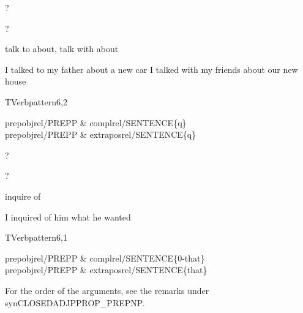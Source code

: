
\begin{thetadescr}
\evitem ?
\esitem
     \begin{examples}
        \example  ?
     \end{examples}
\end{thetadescr}



\begin{thetadescr}
\evitem talk to about, talk with about
\esitem
     \begin{examples}
        \example I talked to my father about a new car
        \example I talked with my friends about our new house 
     \end{examples}
\end{thetadescr}


\newpage
{}
\begin{vpattern}
 TVerbpattern6,2
\csritem \mbox{}\\
     \begin{csr}
     prepobjrel/PREPP & complrel/SENTENCE\{q\}\\
     prepobjrel/PREPP & extraposrel/SENTENCE\{q\}
     \end{csr}
\remarksitem
\end{vpattern}


\begin{thetadescr}
\evitem ?
\esitem
     \begin{examples}
        \example  ?
     \end{examples}
\end{thetadescr}



\begin{thetadescr}
\evitem inquire of
\esitem
     \begin{examples}
        \example I inquired of him what he wanted
     \end{examples}
\end{thetadescr}


\newpage
{}
\begin{vpattern}
 TVerbpattern6,1
\csritem \mbox{}\\
     \begin{csr}
     prepobjrel/PREPP & complrel/SENTENCE\{0-that\}\\
     prepobjrel/PREPP & extraposrel/SENTENCE\{that\}
     \end{csr}
\remarksitem For the order of the arguments, see the remarks under 
synCLOSED\-ADJP\-PROP\_PREPNP.
\end{vpattern}

